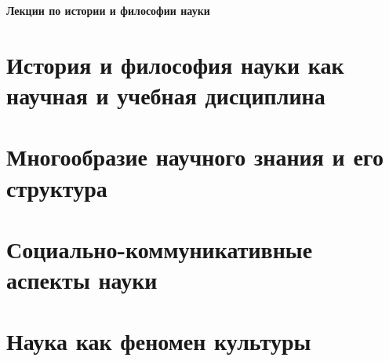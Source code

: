 \documentclass[a4paper, 12pt, notitlepage]{report}
\begin{document}
\begin{titlepage}
    \centering
    \vspace*{9cm}
    {\Huge \textbf{Лекции по истории и философии науки}}
    \vfill
\end{titlepage}

\tableofcontents

\chapter{История и философия науки как научная и учебная дисциплина}


\chapter{Многообразие научного знания и его структура}


\chapter{Социально-коммуникативные аспекты науки}


\chapter{Наука как феномен культуры}


%

%

%

%
\end{document}
